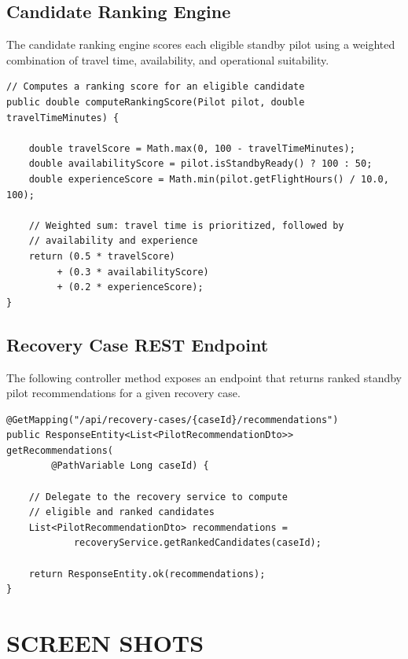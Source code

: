 \documentclass[12pt,a4paper]{report}
\begin{document}
\subsection{Candidate Ranking Engine}

The candidate ranking engine scores each eligible standby pilot using a weighted combination of travel time, availability, and operational suitability.

\begin{singlespace}
\begin{verbatim}
// Computes a ranking score for an eligible candidate
public double computeRankingScore(Pilot pilot, double travelTimeMinutes) {

    double travelScore = Math.max(0, 100 - travelTimeMinutes);
    double availabilityScore = pilot.isStandbyReady() ? 100 : 50;
    double experienceScore = Math.min(pilot.getFlightHours() / 10.0, 100);

    // Weighted sum: travel time is prioritized, followed by
    // availability and experience
    return (0.5 * travelScore)
         + (0.3 * availabilityScore)
         + (0.2 * experienceScore);
}
\end{verbatim}
\end{singlespace}

\subsection{Recovery Case REST Endpoint}

The following controller method exposes an endpoint that returns ranked standby pilot recommendations for a given recovery case.

\begin{singlespace}
\begin{verbatim}
@GetMapping("/api/recovery-cases/{caseId}/recommendations")
public ResponseEntity<List<PilotRecommendationDto>> getRecommendations(
        @PathVariable Long caseId) {

    // Delegate to the recovery service to compute
    // eligible and ranked candidates
    List<PilotRecommendationDto> recommendations =
            recoveryService.getRankedCandidates(caseId);

    return ResponseEntity.ok(recommendations);
}
\end{verbatim}
\end{singlespace}

\section{SCREEN SHOTS}
\end{document}
